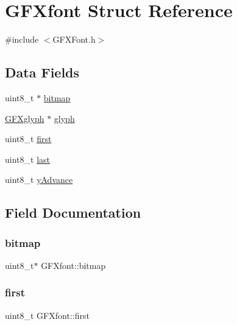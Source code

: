 \hypertarget{struct_g_f_xfont}{}\section{G\+F\+Xfont Struct Reference}
\label{struct_g_f_xfont}


{\ttfamily \#include $<$G\+F\+X\+Font.\+h$>$}

\subsection*{Data Fields}
\begin{DoxyCompactItemize}
\item 
uint8\+\_\+t $\ast$ \mbox{\hyperlink{struct_g_f_xfont_a867b14d604450addbeaf62ae1e4799a7}{bitmap}}
\item 
\mbox{\hyperlink{struct_g_f_xglyph}{G\+F\+Xglyph}} $\ast$ \mbox{\hyperlink{struct_g_f_xfont_af63d88fa053c9a634e86eab7c96db290}{glyph}}
\item 
uint8\+\_\+t \mbox{\hyperlink{struct_g_f_xfont_a8f7483c87a9208a6251d9ac354a33dbb}{first}}
\item 
uint8\+\_\+t \mbox{\hyperlink{struct_g_f_xfont_a2d2ef5e8e2984dc65a7820e2906855b2}{last}}
\item 
uint8\+\_\+t \mbox{\hyperlink{struct_g_f_xfont_ac2c2f0184b810a562be808fbb98822fa}{y\+Advance}}
\end{DoxyCompactItemize}


\subsection{Field Documentation}
\mbox{\label{struct_g_f_xfont_a867b14d604450addbeaf62ae1e4799a7}} 
\subsubsection{\texorpdfstring{bitmap}{bitmap}}
{\footnotesize\ttfamily uint8\+\_\+t$\ast$ G\+F\+Xfont\+::bitmap}

\mbox{\label{struct_g_f_xfont_a8f7483c87a9208a6251d9ac354a33dbb}} 
\subsubsection{\texorpdfstring{first}{first}}
{\footnotesize\ttfamily uint8\+\_\+t G\+F\+Xfont\+::first}

